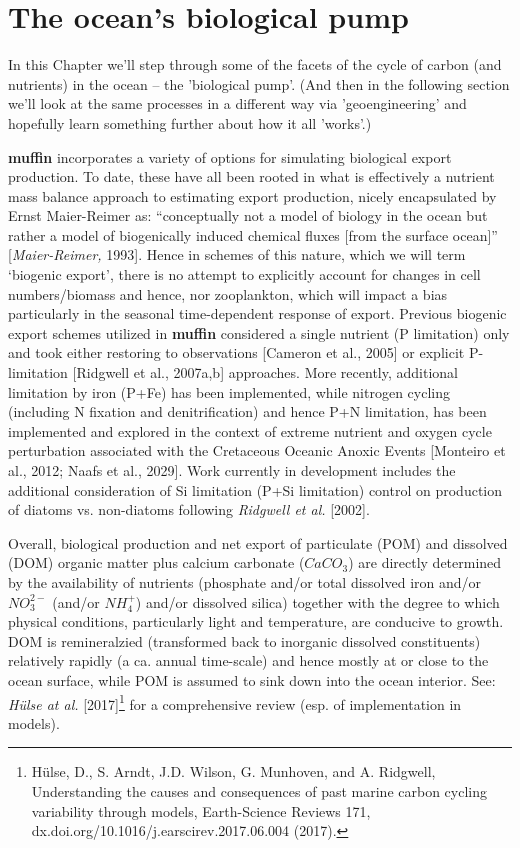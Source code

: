 \documentclass[11pt,fleqn]{book} %
\begin{document}

\section{The ocean's biological pump}

In this Chapter we'll step through some of the facets of the cycle of carbon (and nutrients) in the ocean -- the 'biological pump'. (And then in the following section we'll look at the same processes in a different way via 'geoengineering' and hopefully learn something further about how it all  'works'.)

\textbf{muffin} incorporates a variety of options for simulating biological export production. To date, these have all been rooted in what is effectively a nutrient mass balance approach to estimating export production, nicely encapsulated by Ernst Maier-Reimer as: “conceptually not a model of biology in the ocean but rather a model of biogenically induced chemical fluxes [from the surface ocean]” [\textit{Maier-Reimer,} 1993]. Hence in schemes of this nature, which we will term ‘biogenic export’, there is no attempt to explicitly account for changes in cell numbers/biomass and hence, nor zooplankton, which will impact a bias particularly in the seasonal time-dependent response of export. Previous biogenic export schemes utilized in  \textbf{muffin}  considered a single nutrient (P limitation) only and took either restoring to observations [Cameron et al., 2005] or explicit P-limitation [Ridgwell et al., 2007a,b] approaches. More recently, additional limitation by iron (P+Fe) has been implemented, while nitrogen cycling (including N fixation and denitrification) and hence P+N limitation, has been implemented and explored in the context of extreme nutrient and oxygen cycle perturbation associated with the Cretaceous Oceanic Anoxic Events [Monteiro et al., 2012; Naafs et al., 2029]. Work currently in development includes the additional consideration of Si limitation (P+Si limitation) control on production of diatoms vs. non-diatoms following \textit{Ridgwell et al.} [2002].

Overall, biological production and net export of particulate (POM) and dissolved (DOM) organic matter plus calcium carbonate (\(CaCO_{3}\)) are directly determined by the availability of nutrients (phosphate and/or total dissolved iron and/or \(NO^{2-}_{3}\) (and/or \(NH^{+}_{4}\)) and/or dissolved silica) together with the degree to which physical conditions, particularly light and temperature, are conducive to growth. DOM is remineralzied (transformed back to inorganic dissolved constituents) relatively rapidly (a ca. annual time-scale) and hence mostly at or close to the ocean surface, while POM is assumed to sink down into the ocean interior. See: \textit{Hülse at al.} [2017]\footnote{Hülse, D., S. Arndt, J.D. Wilson, G. Munhoven, and A. Ridgwell, Understanding the causes and consequences of past marine carbon cycling variability through models, Earth-Science Reviews 171, dx.doi.org/10.1016/j.earscirev.2017.06.004 (2017).} for a comprehensive review (esp. of implementation in models).
\end{document}
